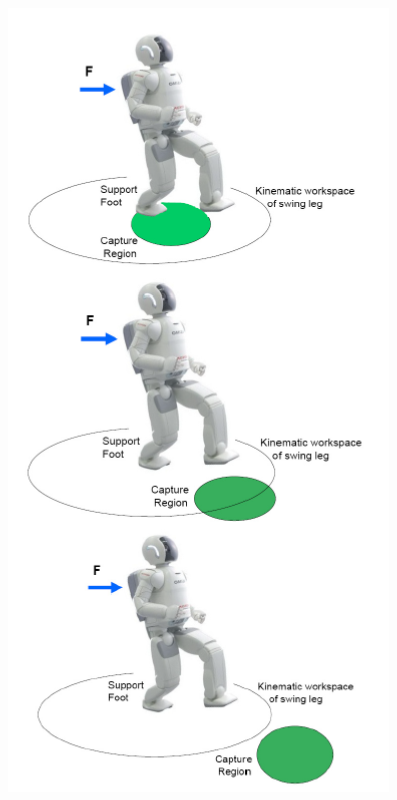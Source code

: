 \documentclass[compress]{beamer}
\begin{document}
\begin{frame}[plain]

    \begin{columns}
        \begin{column}{0.5\linewidth}
            \begin{center}
                \includegraphics[width=0.8\linewidth]{image56}
            \end{center}
        \end{column}
        \begin{column}{0.5\linewidth}
    \begin{itemize}


\end{itemize}
\end{column}
\end{columns}
\end{frame}
\end{document}
